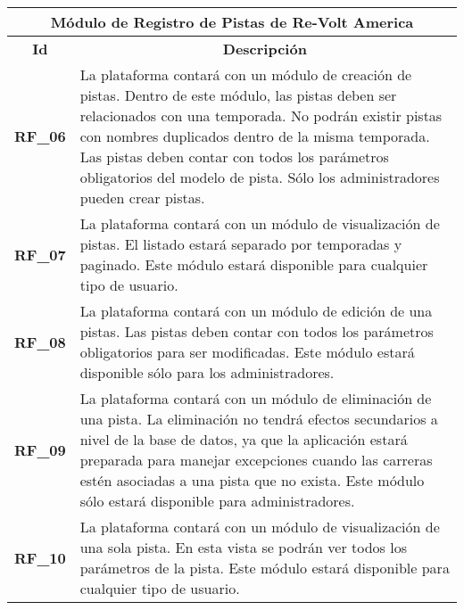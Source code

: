 \begin{center}
	\begin{tabular}{ | l | p{15cm} |}
		\hline
		\multicolumn{2}{|c|}{\textbf{Módulo de Registro de Pistas de Re-Volt America}} \\
		\hline
		\multicolumn{1}{|c|}{\textbf{Id}} & \multicolumn{1}{|c|}{\textbf{Descripción}} \\
		\hline
		{\textbf{RF\_06}} & La plataforma contará con un módulo de creación de pistas. Dentro de este módulo, las pistas deben ser relacionados con una temporada. No podrán existir pistas con nombres duplicados dentro de la misma temporada. Las pistas deben contar con todos los parámetros obligatorios del modelo de pista. Sólo los administradores pueden crear pistas. \\ \hline
		
		{\textbf{RF\_07}} & La plataforma contará con un módulo de visualización de pistas. El listado estará separado por temporadas y paginado. Este módulo estará disponible para cualquier tipo de usuario. \\ \hline
		
		{\textbf{RF\_08}} & La plataforma contará con un módulo de edición de una pistas. Las pistas deben contar con todos los parámetros obligatorios para ser modificadas. Este módulo estará disponible sólo para los administradores. \\ \hline
		
		{\textbf{RF\_09}} & La plataforma contará con un módulo de eliminación de una pista. La eliminación no tendrá efectos secundarios a nivel de la base de datos, ya que la aplicación estará preparada para manejar excepciones cuando las carreras estén asociadas a una pista que no exista. Este módulo sólo estará disponible para administradores. \\ \hline
		
		{\textbf{RF\_10}} & La plataforma contará con un módulo de visualización de una sola pista. En esta vista se podrán ver todos los parámetros de la pista. Este módulo estará disponible para cualquier tipo de usuario. \\ \hline
	\end{tabular}
\end{center}

